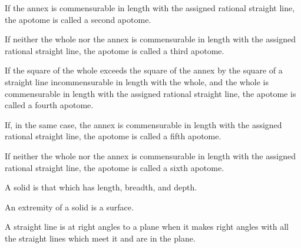 \begin{scope}
\label{def:X.III.2}
If the annex is commensurable in length with the assigned rational
straight line, the apotome is called a second apotome.
\end{scope}

\begin{scope}
\label{def:X.III.3}
If neither the whole nor the annex is commensurable in length with
the assigned rational straight line, the apotome is called a third
apotome.
\end{scope}

\begin{scope}
\label{def:X.III.4}
If the square of the whole exceeds the square of the annex by the
square of a straight line incommensurable in length with the whole,
and the whole is commensurable in length with the assigned rational
straight line, the apotome is called a fourth apotome.
\end{scope}

\begin{scope}
\label{def:X.III.5}
If, in the same case, the annex is commensurable in length with the
assigned rational straight line, the apotome is called a fifth apotome.
\end{scope}

\begin{scope}
\label{def:X.III.6}
If neither the whole nor the annex is commensurable in length with
the assigned rational straight line, the apotome is called a sixth
apotome.
\end{scope}


\begin{scope}
\label{def:XI.1}
A solid is that which has length, breadth, and depth.
\end{scope}

\begin{scope}
\label{def:XI.2}
An extremity of a solid is a surface.
\end{scope}

\begin{scope}
\label{def:XI.3}
A straight line is at right angles to a plane when it makes right
angles with all the straight lines which meet it and are in the plane.
\end{scope}

